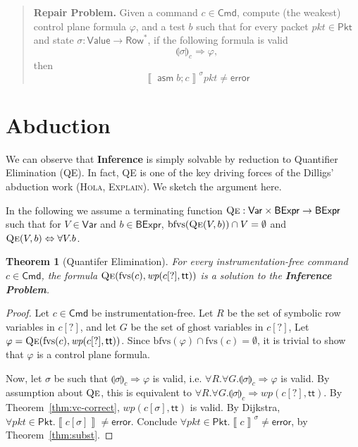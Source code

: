 \documentclass{article}
\newcommand{\pkt}{\mathit{pkt}}
\newcommand{\error}{\mathsf{error}}
\newcommand{\denote}[1]{\left\llbracket#1\right\rrbracket}
\newcommand{\TRUE}{\mathsf{tt}}
\newcommand{\Value}{\mathsf{Value}}
\newcommand{\BExpr}{\mathsf{BExpr}}
\newcommand{\Cmd}{\mathsf{Cmd}}
\newcommand{\Pkt}{\mathsf{Pkt}}
\newcommand{\Row}{\mathsf{Row}}
\newcommand{\Var}{\mathsf{Var}}
\newcommand{\assume}{\mathop{\mathsf{asm}}}
\newcommand{\WP}{\textit{wp}}
\newcommand{\state}[1]{\llparenthesis#1\rrparenthesis}
\newcommand{\instr}{[?]}
\newcommand{\qe}{\textsc{Qe}}
\newcommand{\fvs}{\textrm{fvs}}
\newcommand{\bfvs}{\textrm{bfvs}}
\newtheorem{theorem}{Theorem}
\newtheorem{lemma}{Lemma}
\begin{document}
\begin{quote}
  \textbf{Repair Problem.} Given a command $c \in \Cmd$, compute (the weakest)
  control plane formula $\varphi$, and a test $b$ such that for every
  packet $\pkt \in \Pkt$ and state $\sigma : \Value \to \Row^*$, if the
  following formula is valid
  \[\state\sigma_c \Rightarrow \varphi,\]
  then \[\denote{\assume b; c}^\sigma\pkt \neq \error \]
\end{quote}

\section{Abduction}

We can observe that \textbf{Inference} is simply solvable by reduction to
Quantifier Elimination (QE). In fact, QE is one of the key driving forces of the
Dilligs' abduction work (\textsc{Hola}, \textsc{Explain}). We sketch the
argument here.

In the following we assume a terminating function $\qe : \Var \times \BExpr \to
\BExpr$ such that for $V \in \Var$ and $b \in \BExpr$, $\bfvs(\qe(V,b)) \cap V =
\emptyset$ and $\qe(V,b) \Leftrightarrow \forall V. b$.


\begin{theorem}[Quantifer Elimination]
  For every instrumentation-free command $c \in \Cmd$, the formula $\qe(\fvs(c), \WP(c\instr, \TRUE))$ is a solution to the \textbf{Inference Problem}.
\end{theorem}

\begin{proof}
  Let $c \in \Cmd$ be instrumentation-free. Let $R$ be the set of symbolic row
  variables in $c\instr$, and let $G$ be the set of ghost variables in $c\instr$,
  Let $\varphi = \qe(\fvs(c),\WP(c\instr, \TRUE))$. Since $\bfvs(\varphi) \cap
  \fvs(c) = \emptyset$, it is trivial to show  that $\varphi$ is a
  control plane formula.

  Now, let $\sigma$ be such that $\state\sigma_c \Rightarrow \varphi$ is valid,
  i.e. $\forall R. \forall G. \state\sigma_c \Rightarrow \varphi$ is valid. By
  assumption about $\qe$, this is equivalent to $\forall R.\forall G.
  \state\sigma_c \Rightarrow \WP(c\instr, \TRUE)$. By
  Theorem~\ref{thm:vc-correct}, $\WP(c[\sigma],\TRUE)$ is valid. By Dijkstra,
  $\forall \pkt \in \Pkt. \denote{c[\sigma]} \neq \error$. Conclude $\forall
  \pkt \in \Pkt. \denote{c}^\sigma \neq \error$, by Theorem~\ref{thm:subst}.

\end{proof}
\end{document}
